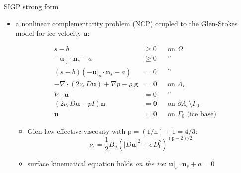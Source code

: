 \documentclass{beamer}
\newcommand{\eps}{\epsilon}
\newcommand{\bn}{\mathbf{n}}
\newcommand{\bu}{\mathbf{u}}
\newcommand{\bzero}{\bm{0}}
\newcommand{\rhoi}{\rho_{\text{i}}}
\newcommand{\pp}{{\text{p}}}
\begin{document}
\begin{frame}{SIGP strong form}

\begin{itemize}
\item \alert{a nonlinear complementarity problem (NCP) coupled to the Glen-Stokes model for ice velocity $\bu$:}

\vspace{-2mm}
\begin{align*}
s - b &\ge 0 && \text{on $\Omega$} \\
- \bu|_s \cdot \bn_s - a &\ge 0 && \text{''} \\
(s - b) (- \bu|_s \cdot \bn_s - a) &= 0 && \text{''} \\
- \nabla \cdot \left(2 \nu_\eps\, D\bu\right) + \nabla p - \rhoi \mathbf{g} &= \bzero && \text{on $\Lambda_s$} \\
\nabla \cdot \bu &= 0 && \text{''} \\
\left(2 \nu_\eps D\bu - pI\right) \bn &= \bzero && \text{on $\partial \Lambda_s \setminus \Gamma_0$} \\
\bu &= \bzero && \text{on $\Gamma_0$ (ice base)}
\end{align*}

    \begin{itemize}
    \item Glen-law effective viscosity with $\text{p}=(1/\text{n})+1=4/3$:
      $$\nu_\eps = \frac{1}{2} B_n \left(|D\bu|^2 + \eps\, D_0^2\right)^{(\pp-2)/2}$$
    \item surface kinematical equation holds \emph{on the ice}: \quad $\bu|_s \cdot \bn_s + a=0$
    \end{itemize}
\end{itemize}
\end{frame}
\end{document}
